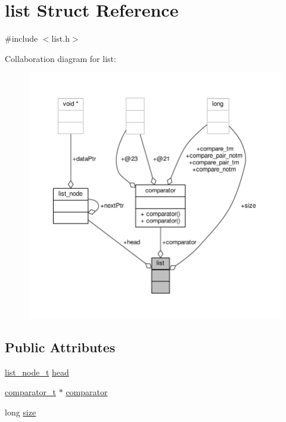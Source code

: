 \hypertarget{structlist}{\section{list Struct Reference}
\label{structlist}
}


{\ttfamily \#include $<$list.\-h$>$}



Collaboration diagram for list\-:
\nopagebreak
\begin{figure}[H]
\begin{center}
\leavevmode
\includegraphics[width=350pt]{structlist__coll__graph}
\end{center}
\end{figure}
\subsection*{Public Attributes}
\begin{DoxyCompactItemize}
\item 
\hyperlink{list_8h_ad8b8636e2e25308b521b32071e849c80}{list\-\_\-node\-\_\-t} \hyperlink{structlist_a52675340671a2030d93dfcdc94bbc815}{head}
\item 
\hyperlink{lehigh_8h_a493abab632f5cea71ed0baaef40590aa}{comparator\-\_\-t} $\ast$ \hyperlink{structlist_abd348acf9d415c64cf4b2019faaabeee}{comparator}
\item 
long \hyperlink{structlist_aa08db5b0d9b53779bda7164fc8488a56}{size}
\end{DoxyCompactItemize}


